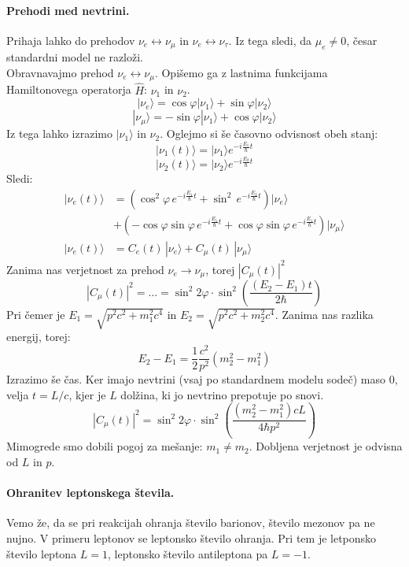 \documentclass[a4paper]{article}
\begin{document}
\paragraph{Prehodi med nevtrini.} Prihaja lahko do prehodov \(\nu_e \leftrightarrow \nu_\mu\) in \(\nu_e \leftrightarrow \nu_\tau\). Iz tega sledi, da \(\mu_e \neq 0\), česar standardni model ne razloži. \\
Obravnavajmo prehod \(\nu_e \leftrightarrow \nu_\mu\). Opišemo ga z lastnima funkcijama Hamiltonovega operatorja \(\widehat{H}\): \(\nu_1\) in \(\nu_2\).
\[|\nu_e\rangle = \cos\varphi |\nu_1\rangle + \sin\varphi|\nu_2\rangle\]
\[|\nu_\mu\rangle = -\sin\varphi |\nu_1\rangle + \cos\varphi|\nu_2\rangle\]
Iz tega lahko izrazimo \(|\nu_1\rangle\) in \(\nu_2\). Oglejmo si še časovno odvisnost obeh stanj:
\[|\nu_1(t)\rangle = |\nu_1\rangle e^{-i\frac{E_1}{\hbar}t}\]
\[|\nu_2(t)\rangle = |\nu_2\rangle e^{-i\frac{E_2}{\hbar}t}\]
Sledi:
\begin{align*}
    |\nu_e(t)\rangle & = (\cos^2\varphi\,e^{-i\frac{E_1}{\hbar}t} + \sin^2\,e^{-i\frac{E_2}{\hbar}t})|\nu_e\rangle \\
    & + (-\cos\varphi\sin\varphi\,e^{-i\frac{E_1}{\hbar}t} + \cos\varphi\sin\varphi\,e^{-i\frac{E_1}{\hbar}t})|\nu_\mu\rangle \\[2mm]
    |\nu_e(t)\rangle & = C_e(t)\,|\nu_e\rangle + C_\mu(t)\,|\nu_\mu\rangle
\end{align*}
Zanima nas verjetnost za prehod \(\nu_e \to \nu_\mu\), torej \(|C_\mu(t)|^2\) \\
\[|C_\mu(t)|^2 = ... = \sin^2 2\varphi \cdot \sin^2\left(\frac{(E_2 - E_1)t}{2\hbar}\right)\]
Pri čemer je \(E_1 = \sqrt{p^2c^2 + m_1^2c^4}\) in \(E_2 = \sqrt{p^2c^2 + m_2^2c^4}\). Zanima nas razlika energij, torej:
\[E_2 - E_1 = \frac{1}{2}\frac{c^2}{p^2}\left(m_2^2 - m_1^2\right)\]
Izrazimo še čas. Ker imajo nevtrini (vsaj po standardnem modelu sodeč) maso \(0\), velja
\(t = L/c\), kjer je \(L\) dolžina, ki jo nevtrino prepotuje po snovi.
\[|C_\mu(t)|^2 = \sin^2 2\varphi \cdot \sin^2\left(\frac{(m_2^2 - m_1^2)cL}{4\hbar p^2}\right)\]
Mimogrede smo dobili pogoj za mešanje: \(m_1 \neq m_2\).
Dobljena verjetnost je odvisna od \(L\) in \(p\).
\paragraph{Ohranitev leptonskega števila.} Vemo že, da se pri reakcijah ohranja število barionov, število mezonov pa ne nujno.
V primeru leptonov se leptonsko število ohranja. Pri tem je letponsko število leptona \(L = 1\), leptonsko število antileptona pa \(L = -1\).
\end{document}
